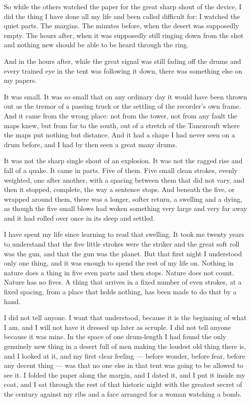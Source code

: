 So while the others watched the paper for the great sharp shout of the device, I did the thing I have done all my life and been called difficult for: I watched the quiet parts. The margins. The minutes before, when the desert was supposedly empty. The hours after, when it was supposedly still ringing down from the shot and nothing new should be able to be heard through the ring.\par

And in the hours after, while the great signal was still fading off the drums and every trained eye in the tent was following it down, there was something else on my papers.\par

It was small. It was so small that on any ordinary day it would have been thrown out as the tremor of a passing truck or the settling of the recorder's own frame. And it came from the wrong place: not from the tower, not from any fault the maps knew, but from far to the south, out of a stretch of the Tanezrouft where the maps put nothing but distance. And it had a shape I had never seen on a drum before, and I had by then seen a great many drums.\par

It was not the sharp single shout of an explosion. It was not the ragged rise and fall of a quake. It came in parts. Five of them. Five small clean strokes, evenly weighted, one after another, with a spacing between them that did not vary, and then it stopped, complete, the way a sentence stops. And beneath the five, or wrapped around them, there was a longer, softer return, a swelling and a dying, as though the five small blows had woken something very large and very far away and it had rolled over once in its sleep and settled.\par

I have spent my life since learning to read that swelling. It took me twenty years to understand that the five little strokes were the striker and the great soft roll was the gun, and that the gun was the planet. But that first night I understood only one thing, and it was enough to spend the rest of my life on. Nothing in nature does a thing in five even parts and then stops. Nature does not count. Nature has no fives. A thing that arrives in a fixed number of even strokes, at a fixed spacing, from a place that holds nothing, has been made to do that by a hand.\par

I did not tell anyone. I want that understood, because it is the beginning of what I am, and I will not have it dressed up later as scruple. I did not tell anyone because it was mine. In the space of one drum-length I had found the only genuinely new thing in a desert full of men making the loudest old thing there is, and I looked at it, and my first clear feeling --- before wonder, before fear, before any decent thing --- was that no one else in that tent was going to be allowed to see it. I folded the paper along the margin, and I dated it, and I put it inside my coat, and I sat through the rest of that historic night with the greatest secret of the century against my ribs and a face arranged for a woman watching a bomb.\par

